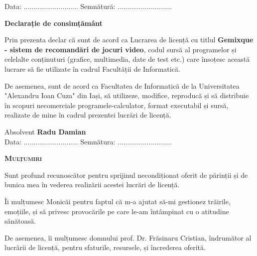 \documentclass[12pt,a4paper]{report}
\newcommand{\dottedline}    {............................}
\begin{document}
\begin{titlepage}
	 \hfill \break
	 
	 \hspace{1em} Data: \dottedline
	 \hspace{12em} Semnătură: \dottedline
	 
\end{titlepage}

\begin{titlepage}
	\hfill \break
	\begin{center}
	\large
	\textbf{Declarație de consimțământ}
	\end{center}
	
	\hfill \break
	\justifying
	Prin prezenta declar că sunt de acord ca Lucrarea de
	licență cu titlul \textbf{Gemixque - sistem de recomandări de jocuri video},
	codul sursă al programelor și celelalte conținuturi
	(grafice, multimedia, date de test etc.) care însoțesc
	această lucrare să fie utilizate în cadrul Facultății
	de Informatică.
	
	De asemenea, sunt de acord ca Facultatea de Informatică
	de la Universitatea "Alexandru Ioan Cuza" din Iași,
	să utilizeze, modifice, reproducă și să distribuie în
	scopuri necomerciale programele-calculator, format
	executabil și sursă, realizate de mine în cadrul prezentei
	lucrări de licență.
	
\begin{flushright}
    Absolvent \textbf{Radu Damian} \\
    \vspace{0.5cm}
    Data: \dottedline \hspace{5cm} Semnătura: \dottedline
\end{flushright}
	
	
\end{titlepage}

\hfill \break
	\begin{center}
	{\scshape\large \textbf{Mulțumiri} \par}
	\end{center}
	
\begin{flushright}
\hfill \break
\hfill \break
Sunt profund recunoscător pentru sprijinul necondiționat oferit de părinții și de bunica mea în vederea realizării acestei lucrări de licență.
\end{flushright}
\hfill \break
\hfill \break
\hfill \break
\begin{flushright}
Îi mulțumesc Monicăi pentru faptul că m-a ajutat să-mi gestionez trăirile, emoțiile, și să privesc provocările pe care le-am întâmpinat cu o atitudine sănătoasă.
\end{flushright}
\hfill \break
\hfill \break
\hfill \break
\begin{flushright}
De asemenea, îi mulțumesc domnului prof. Dr. Frăsinaru Cristian, îndrumător al lucrării de licență, pentru sfaturile, resursele, și încrederea oferită.
\end{flushright}
\end{document}
